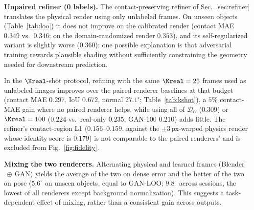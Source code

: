 \noindent\textbf{Unpaired refiner (0 labels).} The contact-preserving refiner of Sec.~\ref{sec:refiner} translates the physical render using only unlabeled frames. On unseen objects (Table~\ref{tab:loo}) it does not improve on the calibrated render (contact MAE $0.349$ vs.\ $0.346$; on the domain-randomized render $0.353$), and its self-regularized variant is slightly worse ($0.360$): one possible explanation is that adversarial training rewards plausible shading without sufficiently constraining the geometry needed for downstream prediction.

In the $\Kreal$-shot protocol, refining with the same $\Kreal=25$ frames used as unlabeled images improves over the paired-renderer baselines at that budget (contact MAE $0.297$, IoU $0.672$, normal $27.1^\circ$; Table~\ref{tab:kshot}), a $5\%$ contact-MAE gain where no paired renderer helps, while using all of $\mathcal{D}_U$ ($0.309$) or $\Kreal=100$ ($0.224$ vs.\ real-only $0.235$, GAN-100 $0.210$) adds little. The refiner's contact-region L1 ($0.156$--$0.159$, against the $\pm3\,$px-warped physics render whose identity score is $0.179$) is not comparable to the paired renderers' and is excluded from Fig.~\ref{fig:fidelity}.

\noindent\textbf{Mixing the two renderers.} Alternating physical and learned frames (Blender$\,\oplus\,$GAN) yields the average of the two on dense error and the better of the two on pose ($5.6^\circ$ on unseen objects, equal to GAN-LOO; $9.8^\circ$ across sessions, the lowest of all renderers except background normalization). This suggests a task-dependent effect of mixing, rather than a consistent gain across outputs.
